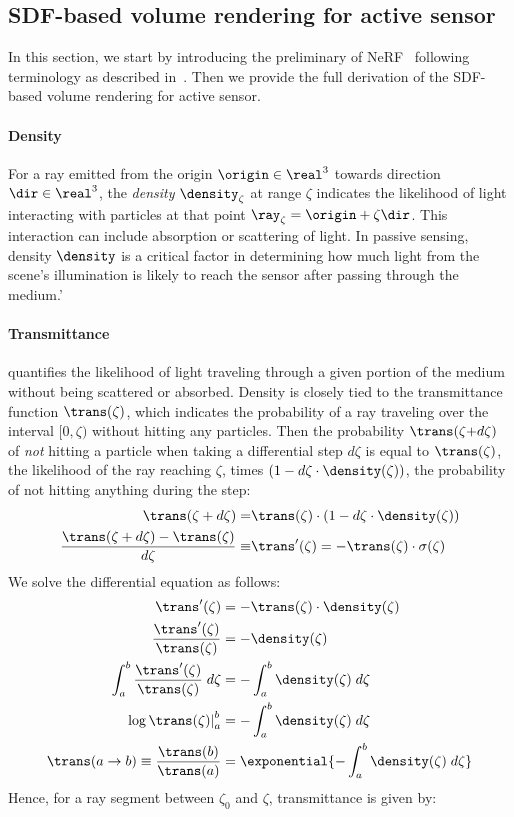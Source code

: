 \subsection{SDF-based volume rendering for active sensor}\label{sec:sup_sdf_vol_render}
In this section, we start by introducing the preliminary of NeRF~\cite{mildenhall2020nerf} following terminology as described in~\cite{tagliasacchi2022volume}. Then we provide the full derivation of the SDF-based volume rendering for active sensor. 

\paragraph{Density}
For a ray emitted from the origin $\origin \in \real^3$ towards direction $\dir \in \real^3$, the \textit{density} $\density_\zeta$ at range $\zeta$ indicates the likelihood of light interacting with particles at that point $\ray_\zeta = \origin + \zeta \dir$. This interaction can include absorption or scattering of light. In passive sensing, density $\density$ is a critical factor in determining how much light from the scene's illumination is likely to reach the sensor after passing through the medium.'

\paragraph{Transmittance} 
quantifies the likelihood of light traveling through a given portion of the medium without being scattered or absorbed. Density is closely tied to the transmittance function $\trans(\zeta)$, which indicates the probability of a ray traveling over the interval $[0, \zeta)$ without hitting any particles. Then the probability $\trans(\zeta {+} d\zeta)$ of \emph{not} hitting a particle when taking a differential step $d\zeta$ is equal to $\trans(\zeta)$, the likelihood of the ray reaching $\zeta$, times $(1 - d\zeta \cdot \density(\zeta))$, the probability of not hitting anything during the step:
% 
\begin{align}
\trans(\zeta+d\zeta) =& \trans(\zeta) \cdot (1 - d\zeta \cdot \density(\zeta))
\\
\frac{\trans(\zeta+d\zeta) - \trans(\zeta)}{d\zeta} \equiv& \trans'(\zeta) = -\trans(\zeta) \cdot \sigma(\zeta) 
\label{eq:derivative}
\end{align}
% 
We solve the differential equation as follows:
%
\begin{align}
\trans'(\zeta) &= -\trans(\zeta) \cdot \density(\zeta) \\
\frac{\trans'(\zeta)}{\trans(\zeta)} &= -\density(\zeta) \\
\int_a^b \frac{\trans'(\zeta)}{\trans(\zeta)} \; d\zeta &= -\int_a^b \density(\zeta) \; d\zeta \\
\left. \log \trans(\zeta) \right|_a^b &= -\int_a^b \density(\zeta) \; d\zeta \\
\trans(a \rightarrow b) \equiv \frac{\trans(b)}{\trans(a)} &= \exponential{-\int_a^b \density(\zeta) \; d\zeta}   
\end{align}
% 
Hence, for a ray segment between $\zeta_0$ and $\zeta$, transmittance is given by:

